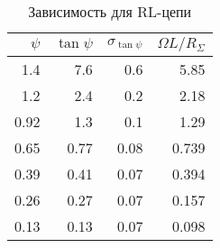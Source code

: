 \begin{table} 
 \caption{Зависимость для RL-цепи}
 \label{RLtable}
 \begin{center}
\begin{tabular}{|*{4}{r|}}
\hline 
$\psi$ & $\tan \psi$ & $\sigma_{\tan \psi}$ & $\Omega L / R_\Sigma$ \\ \hline 
 1.4  & 7.6  & 0.6  & 5.85  \\ \hline 
 1.2  & 2.4  & 0.2  & 2.18  \\ \hline 
 0.92 & 1.3  & 0.1  & 1.29  \\ \hline 
 0.65 & 0.77 & 0.08 & 0.739 \\ \hline 
 0.39 & 0.41 & 0.07 & 0.394 \\ \hline 
 0.26 & 0.27 & 0.07 & 0.157 \\ \hline 
 0.13 & 0.13 & 0.07 & 0.098 \\ \hline 
 \end{tabular} 
 \end{center}
\end{table} 
